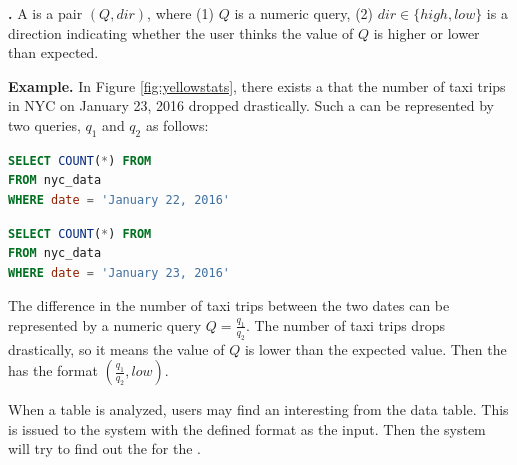 {\bf {\Fact}.} A {\fact} is a pair $(Q, dir)$, where (1) $Q$ is a numeric query, (2) $dir \in \{high, low\}$ is a direction indicating whether the user thinks the value of $Q$ is higher or lower than expected.

{\bf Example.} In Figure \ref{fig:yellowstats}, there exists a {\fact} that the number of taxi trips in NYC on January 23, 2016 dropped drastically. Such a {\fact} can be represented by two queries, $q_1$ and $q_2$ as follows:

\renewcommand{\lstlistingname}{Query}%
\begin{lstlisting}[language=SQL, caption=Aggregate Query for the number of taxi trips on January 22, label=qry:aggregateexample1]
SELECT COUNT(*) FROM
FROM nyc_data
WHERE date = 'January 22, 2016'
\end{lstlisting}
\renewcommand{\lstlistingname}{Query}%
\begin{lstlisting}[language=SQL, caption=Aggregate Query for the number of taxi trips on January 23, label=qry:aggregateexample2]
SELECT COUNT(*) FROM
FROM nyc_data
WHERE date = 'January 23, 2016'
\end{lstlisting}
The difference in the number of taxi trips between the two dates can be represented by a numeric query $Q = \frac{q_1}{q_2}$. The number of taxi trips drops drastically, so it means the value of $Q$ is lower than the expected value. Then the {\fact} has the format $(\frac{q_1}{q_2}, low)$.

When a table is analyzed, users may find an interesting {\fact} from the data table. This {\fact} is issued to the system with the defined format as the input. Then the system will try to find out the {\explanation} for the {\fact}.


